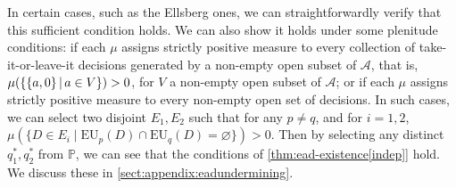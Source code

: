 \documentclass[a4paper,final]{article}
\newcommand\A{\mathcal{A}}
\renewcommand\P{\mathbb{P}} %
\newcommand\EU{\mathrm{EU}}
\newcommand{\IP}{\P}
\renewcommand{\color}[1]{}
\newenvironment{colored}[1]{\leavevmode\color{#1}}{}
\newcommand\SetDelimiter[1][]{
	\nonscript\,#1\vert \allowbreak \nonscript\,\mathopen{}}
\providecommand\given{\SetDelimiter}
\renewcommand{\emptyset}{\varnothing}
\newenvironment{CCM rewritten}
{\begingroup\color{blue}} %
{\endgroup}              %
\begin{document}
In certain cases, such as the Ellsberg ones, we  can straightforwardly verify that this sufficient condition holds. 
We can also show it holds under some plenitude conditions: if each $\mu$ assigns strictly positive measure to every collection of take-it-or-leave-it decisions generated by a non-empty open subset of $\A$, that is, $\mu(\{\{a,0\}\given a\in V\})>0$, for $V$ a non-empty open subset of $\A$; or if each $\mu$ assigns strictly positive measure to every non-empty open set of decisions. In such cases, we can select two disjoint $E_1,E_2$ such that for any $p\neq q$, and for $i = 1, 2$, $\mu(\{D\in E_i \mid \EU_p(D)\cap \EU_q(D)=\emptyset\})>0$. Then by selecting any distinct $q^*_1,q^*_2$ from $\IP$, we can see that the conditions of \cref{thm:ead-existence[indep]} hold. We discuss these in \cref{sect:appendix:eadundermining}.




\end{document}
